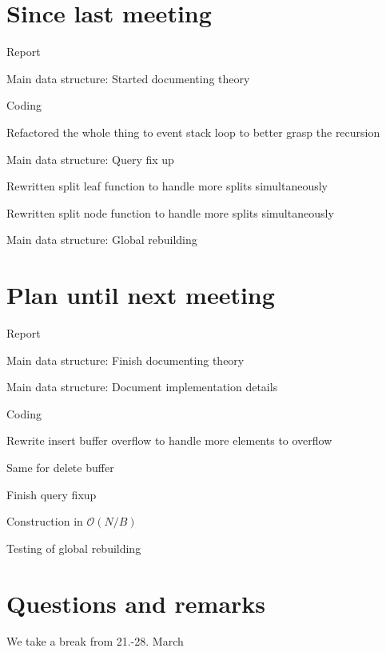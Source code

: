 \documentclass[a4paper,11pt,agenda,chair]{meetingmins}
\begin{document}
\maketitle

\section{Since last meeting}
\begin{items}
\item Report
	\begin{items}
		\item Main data structure: Started documenting theory
	\end{items}
\item Coding
	\begin{items}
		\item Refactored the whole thing to event stack loop to better grasp the recursion
		\item Main data structure: Query fix up
			\begin{items}
				\item Rewritten split leaf function to handle more splits simultaneously
				\item Rewritten split node function to handle more splits simultaneously
			\end{items}
		\item Main data structure: Global rebuilding
		
	\end{items}
\end{items}

\section{Plan until next meeting}
\begin{items}
\item Report
	\begin{items}
		\item Main data structure: Finish documenting theory
		\item Main data structure: Document implementation details
	\end{items}
\item Coding
	\begin{items}
		\item Rewrite insert buffer overflow to handle more elements to overflow
		\item Same for delete buffer
		\item Finish query fixup
		\item Construction in $\mathcal{O}(N/B)$
		\item Testing of global rebuilding
	\end{items}
\end{items}

\section{Questions and remarks}
\begin{items}
	\item We take a break from 21.-28. March
\end{items}
\end{document}
